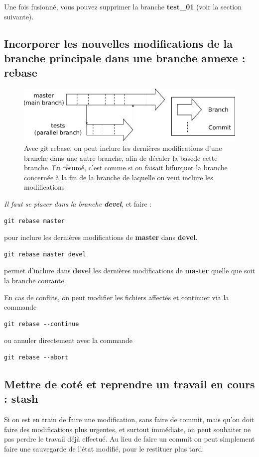 \documentclass[a4paper,twoside]{article}
\begin{document}
Une fois fusionné, vous pouvez supprimer la branche \textbf{test\_01} (voir la section suivante).

\subsection{Incorporer les nouvelles modifications de la branche principale dans une branche annexe : rebase}
\begin{figure}[htb]
\centering
\includegraphics[width=0.75\linewidth]{figure/branchs.pdf}
\caption{Avec git rebase, on peut inclure les dernières modifications d'une branche dans une autre branche, afin de décaler la \og base\fg de cette branche. En résumé, c'est comme si on faisait bifurquer la branche concernée à la fin de la branche de laquelle on veut inclure les modifications}
\end{figure}



\emph{Il faut se placer dans la branche \textbf{devel}}, et faire :
\begin{verbatim}
git rebase master
\end{verbatim}
pour inclure les dernières modifications de \textbf{master} dans \textbf{devel}.

\begin{verbatim}
git rebase master devel
\end{verbatim}
permet d'inclure dans \textbf{devel} les dernières modifications de \textbf{master} quelle que soit la branche courante.
\bigskip

En cas de conflits, on peut modifier les fichiers affectés et continuer via la commande 
\begin{verbatim}
git rebase --continue
\end{verbatim}
ou annuler directement avec la commande
\begin{verbatim}
git rebase --abort
\end{verbatim}

\subsection{Mettre de coté et reprendre un travail en cours : stash}
Si on est en train de faire une modification, sans faire de commit, mais qu'on doit faire des modifications plus urgentes, et surtout immédiate, on peut souhaiter ne pas perdre le travail déjà effectué. Au lieu de faire un commit on peut simplement faire une sauvegarde de l'état modifié, pour le restituer plus tard.
\end{document}

